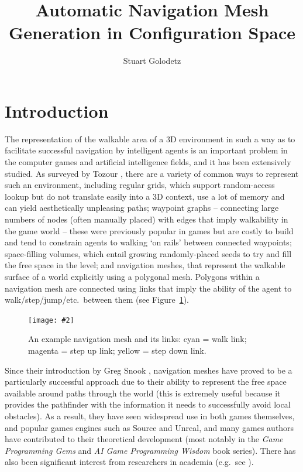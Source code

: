 \documentclass[10pt,twocolumn]{article}
\newcommand{\stufigex}[5]					%
{
	\begin{figure}[#5]
	\begin{center}
		\texttt{[image: \#2]}
		\caption{#3}
		\label{#4}
	\end{center}
	\end{figure}
}
\begin{document}
\title{Automatic Navigation Mesh Generation in Configuration Space}
\author{Stuart Golodetz}
\date{}
\maketitle

\section{Introduction}

The representation of the walkable area of a 3D environment in such a way as to facilitate successful navigation by intelligent agents is an important problem in the computer games and artificial intelligence fields, and it has been extensively studied. As surveyed by Tozour \cite{tozour04}, there are a variety of common ways to represent such an environment, including regular grids, which support random-access lookup but do not translate easily into a 3D context, use a lot of memory and can yield aesthetically unpleasing paths; waypoint graphs -- connecting large numbers of nodes (often manually placed) with edges that imply walkability in the game world -- these were previously popular in games but are costly to build and tend to constrain agents to walking `on rails' between connected waypoints; space-filling volumes, which entail growing randomly-placed seeds to try and fill the free space in the level; and navigation meshes, that represent the walkable surface of a world explicitly using a polygonal mesh. Polygons within a navigation mesh are connected using links that imply the ability of the agent to walk/step/jump/etc.\ between them (see Figure~\ref{fig:navmeshexample}).

\stufigex{width=.9\linewidth}{blakeney-upperramp-clearer.png}{An example navigation mesh and its links: cyan = walk link; magenta = step up link; yellow = step down link.}{fig:navmeshexample}{t}

Since their introduction by Greg Snook \cite{snook00}, navigation meshes have proved to be a particularly successful approach due to their ability to represent the free space available around paths through the world (this is extremely useful because it provides the pathfinder with the information it needs to successfully avoid local obstacles). As a result, they have seen widespread use in both games themselves, and popular games engines such as Source and Unreal, and many games authors have contributed to their theoretical development (most notably in the \emph{Game Programming Gems} and \emph{AI Game Programming Wisdom} book series). There has also been significant interest from researchers in academia (e.g.~see \cite{hale09,kallmann10,pettre05,vantoll11}).
\end{document}

